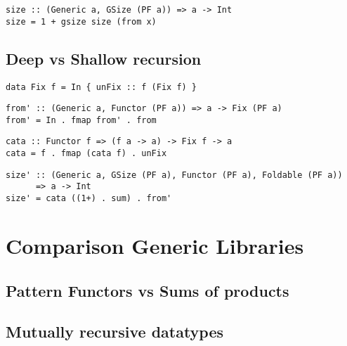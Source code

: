 \begin{verbatim}
size :: (Generic a, GSize (PF a)) => a -> Int
size = 1 + gsize size (from x)
\end{verbatim}

\subsection{Deep vs Shallow recursion}
\begin{verbatim}
data Fix f = In { unFix :: f (Fix f) }
\end{verbatim}
    
\begin{verbatim}
from' :: (Generic a, Functor (PF a)) => a -> Fix (PF a)
from' = In . fmap from' . from
\end{verbatim}

\begin{verbatim}
cata :: Functor f => (f a -> a) -> Fix f -> a
cata = f . fmap (cata f) . unFix
\end{verbatim}

\begin{verbatim}
size' :: (Generic a, GSize (PF a), Functor (PF a), Foldable (PF a)) 
      => a -> Int
size' = cata ((1+) . sum) . from'
\end{verbatim}

\section{Comparison Generic Libraries}
\subsection{Pattern Functors vs Sums of products}

\subsection{Mutually recursive datatypes}
